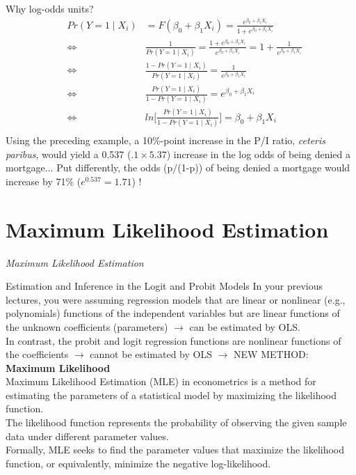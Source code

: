 \documentclass[notes,10pt, aspectratio=169]{beamer}
\begin{document}
\begin{frame}{Why log-odds units?}
\begin{eqnarray*}
    &Pr(Y=1\mid X_i)&= F(\beta_0 + \beta_1 X_i) =\frac{e^{\beta_0 + \beta_1 X_i}}{1+e^{\beta_0 + \beta_1 X_i}}\\
& \Leftrightarrow & \frac{1}{Pr(Y=1\mid X_i)} = \frac{1+e^{\beta_0 + \beta_1 X_i}}{e^{\beta_0 + \beta_1 X_i}}=1+\frac{1}{e^{\beta_0 + \beta_1 X_i}}\\
& \Leftrightarrow & \frac{1 - Pr(Y=1\mid X_i)}{Pr(Y=1\mid X_i)}  =\frac{1}{e^{\beta_0 + \beta_1 X_i}}\\
& \Leftrightarrow & \frac{Pr(Y=1\mid X_i)}{1 - Pr(Y=1\mid X_i)}  =e^{\beta_0 + \beta_1 X_i}\\
& \Leftrightarrow & ln\Bigg[\frac{Pr(Y=1\mid X_i)}{1 - Pr(Y=1\mid X_i)}\Bigg]  =\beta_0 + \beta_1 X_i\\
\end{eqnarray*}
Using the preceding example, a 10\%-point increase in the P/I ratio, \textit{ceteris paribus}, would yield a 0.537 ($.1\times5.37$) increase in the log odds of being denied a mortgage... Put differently, the odds (p/(1-p)) of being denied a mortgage would increase by 71\% ($e^{0.537}=1.71$) !
\end{frame}


\section{Maximum Likelihood Estimation}

\begin{frame}
  \vfill
  \centering
    {\huge \color{blue} \textit{Maximum Likelihood Estimation}}
  \vfill
\end{frame}

\begin{frame}{Estimation and Inference in the Logit and Probit Models}
In your previous lectures, you were assuming regression models that are linear or nonlinear (e.g., polynomials) functions of the independent variables but are linear functions of the unknown coefficients (parameters) $\rightarrow$ can be estimated by OLS.\\[1em]
In contrast, the probit and logit regression functions are nonlinear
functions of the coefficients $\rightarrow$ cannot be estimated by OLS $\rightarrow$ {\color{green} NEW METHOD:} \textbf{Maximum Likelihood}\\[1em]
Maximum Likelihood Estimation (MLE) in econometrics is a method for estimating the parameters of a statistical model by maximizing the likelihood function.\\[1em]
The likelihood function represents the probability of observing the given sample data under different parameter values.\\[1em]
Formally, MLE seeks to find the parameter values that maximize the likelihood function, or equivalently, minimize the negative log-likelihood.\\[1em]
\end{frame}
\end{document}
